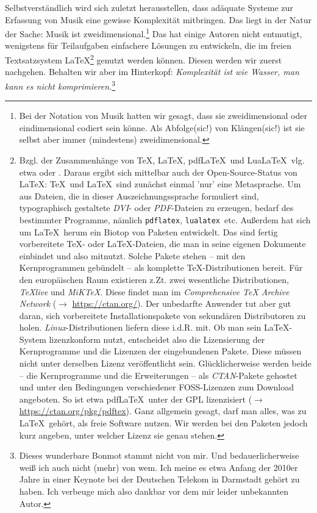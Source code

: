 \documentclass[
  DIV=calc,
  BCOR=5mm,
  12pt,
  headings=small,
  twoside,
  abstract=true,
  toc=bib,
  xcolor=dvipsnames,
  openany,
  english,ngerman]{scrbook}
\newcommand{\acc}[0]{\textit}
\begin{document}
Selbstverständlich wird sich zuletzt herausstellen, dass adäquate Systeme zur
Erfassung von Musik eine gewisse Komplexität mitbringen. Das liegt in der Natur
der Sache: Musik ist zweidimensional.\footnote{Bei der Notation von Musik hatten
wir gesagt, dass sie zweidimensional oder eindimensional codiert sein könne.
Als Abfolge(sic!) von Klängen(sic!) ist sie selbst aber immer (mindestens)
zweidimensional.} Das hat einige Autoren nicht entmutigt, wenigstens für
Teilaufgaben einfachere Lösungen zu entwickeln, die im freien Textsatzsystem
\LaTeX\footnote{Bzgl. der Zusammenhänge von \TeX, \LaTeX, pdf\LaTeX\ und
Lua\LaTeX\ vlg. etwa \cite[][7ff]{Voss2018a} oder \cite[][8ff]{Voss2012a}.
Daraus ergibt sich mittelbar auch der Open-Source-Status von \LaTeX: \TeX\ und
\LaTeX\ sind zunächst einmal 'nur' eine Metasprache. Um aus Dateien, die in
dieser Auszeichnungssprache formuliert sind, typographisch gestaltete \acc{DVI}-
oder \acc{PDF}-Dateien zu erzeugen, bedarf des bestimmter Programme, nämlich
\texttt{pdflatex}, \texttt{lualatex}\ etc. Außerdem hat sich um \LaTeX\ herum ein
Biotop von Paketen entwickelt. Das sind fertig vorbereitete \TeX- oder
\LaTeX-Dateien, die man in seine eigenen Dokumente einbindet und also mitnutzt.
Solche Pakete stehen -- mit den Kernprogrammen gebündelt -- als komplette
\TeX-Distributionen bereit. Für den europäischen Raum existieren z.Zt. zwei
wesentliche Distributionen, \acc{{\TeX}live} und \acc{MiK{\TeX}}. Diese findet
man im \acc{Comprehensive TeX Archive Network} ($\rightarrow$
\href{https://ctan.org/}{https://ctan.org/}). Der unbedarfte Anwender tut aber
gut daran, sich vorbereitete Installationspakete von sekundären Distributoren zu
holen. \acc{Linux}-Distributionen liefern diese i.d.R. mit. Ob man sein
\LaTeX-System lizenzkonform nutzt, entscheidet also die Lizensierung der
Kernprogramme und die Lizenzen der eingebundenen Pakete. Diese müssen nicht
unter derselben Lizenz veröffentlicht sein. Glücklicherweise werden beide -- die
Kernprogramme und die Erweiterungen -- als \acc{CTAN}-Pakete gehostet und unter
den Bedingungen verschiedener FOSS-Lizenzen zum Download angeboten. So ist etwa
pdf\LaTeX\ unter der GPL lizenzisiert ($\rightarrow$
\href{https://ctan.org/pkg/pdftex} {https://ctan.org/pkg/pdftex}). Ganz
allgemein gesagt, darf man alles, was zu \LaTeX\ gehört, als freie Software
nutzen. Wir werden bei den Paketen jedoch kurz angeben, unter welcher Lizenz sie
genau stehen.} genutzt werden können.
Diesen werden wir zuerst nachgehen. Behalten wir aber im Hinterkopf:
\acc{Komplexität ist wie Wasser, man kann es nicht
komprimieren.}\footnote{Dieses wunderbare Bonmot stammt nicht von mir. Und
bedauerlicherweise weiß ich auch nicht (mehr) von wem. Ich meine es etwa Anfang
der 2010er Jahre in einer Keynote bei der Deutschen Telekom in Darmstadt gehört
zu haben. Ich verbeuge mich also dankbar vor dem mir leider unbekannten Autor.}
\end{document}
